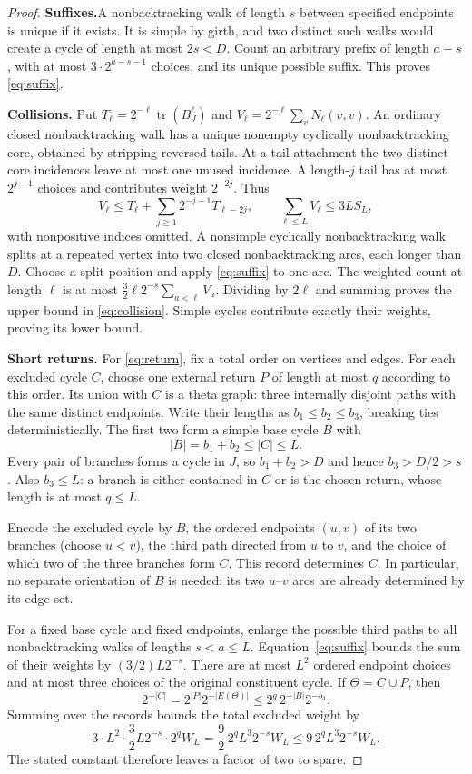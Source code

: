 \documentclass[11pt,a4paper]{article}
\numberwithin{equation}{section}
\theoremstyle{definition}
\theoremstyle{remark}
\newcommand{\tr}{\operatorname{tr}}
\newcommand{\proofstep}[1]{\par\addvspace{\medskipamount}\noindent\textbf{#1}\enspace\ignorespaces}
\begin{document}
\begin{proof}
\textbf{Suffixes.}\enspace A nonbacktracking walk of length $s$ between specified endpoints is unique if it exists. It is simple by girth, and two distinct such walks would create a cycle of length at most $2s<D$. Count an arbitrary prefix of length $a-s$, with at most $3\cdot2^{a-s-1}$ choices, and its unique possible suffix. This proves \eqref{eq:suffix}.

\proofstep{Collisions.}
Put $T_\ell=2^{-\ell}\tr(B_J^\ell)$ and $V_\ell=2^{-\ell}\sum_vN_\ell(v,v)$. An ordinary closed nonbacktracking walk has a unique nonempty cyclically nonbacktracking core, obtained by stripping reversed tails. At a tail attachment the two distinct core incidences leave at most one unused incidence. A length-$j$ tail has at most $2^{j-1}$ choices and contributes weight $2^{-2j}$. Thus
\[
 V_\ell\le T_\ell+\sum_{j\ge1}2^{-j-1}T_{\ell-2j},
 \qquad \sum_{\ell\le L}V_\ell\le3LS_L,
\]
with nonpositive indices omitted. A nonsimple cyclically nonbacktracking walk splits at a repeated vertex into two closed nonbacktracking arcs, each longer than $D$. Choose a split position and apply \eqref{eq:suffix} to one arc. The weighted count at length $\ell$ is at most
$\frac32\ell2^{-s}\sum_{a<\ell}V_a$.
Dividing by $2\ell$ and summing proves the upper bound in \eqref{eq:collision}. Simple cycles contribute exactly their weights, proving its lower bound.

\proofstep{Short returns.}
For \eqref{eq:return}, fix a total order on vertices and edges. For each excluded cycle $C$, choose one external return $P$ of length at most $q$ according to this order. Its union with $C$ is a theta graph: three internally disjoint paths with the same distinct endpoints. Write their lengths as $b_1\le b_2\le b_3$, breaking ties deterministically. The first two form a simple base cycle $B$ with
\[
 |B|=b_1+b_2\le |C|\le L.
\]
Every pair of branches forms a cycle in $J$, so $b_1+b_2>D$ and hence $b_3>D/2>s$. Also $b_3\le L$: a branch is either contained in $C$ or is the chosen return, whose length is at most $q\le L$.

Encode the excluded cycle by $B$, the ordered endpoints $(u,v)$ of its two branches (choose $u<v$), the third path directed from $u$ to $v$, and the choice of which two of the three branches form $C$. This record determines $C$. In particular, no separate orientation of $B$ is needed: its two $u$--$v$ arcs are already determined by its edge set.

For a fixed base cycle and fixed endpoints, enlarge the possible third paths to all nonbacktracking walks of lengths $s<a\le L$. Equation~\eqref{eq:suffix} bounds the sum of their weights by $(3/2)L2^{-s}$. There are at most $L^2$ ordered endpoint choices and at most three choices of the original constituent cycle. If $\Theta=C\cup P$, then
\[
 2^{-|C|}=2^{|P|}2^{-|E(\Theta)|}
       \le2^q\,2^{-|B|}2^{-b_3}.
\]
Summing over the records bounds the total excluded weight by
\[
 3\cdot L^2\cdot\frac32 L2^{-s}\cdot2^q W_L
 =\frac92\,2^qL^3 2^{-s}W_L
 \le9\,2^qL^3 2^{-s}W_L.
\]
The stated constant therefore leaves a factor of two to spare.
\end{proof}
\end{document}
